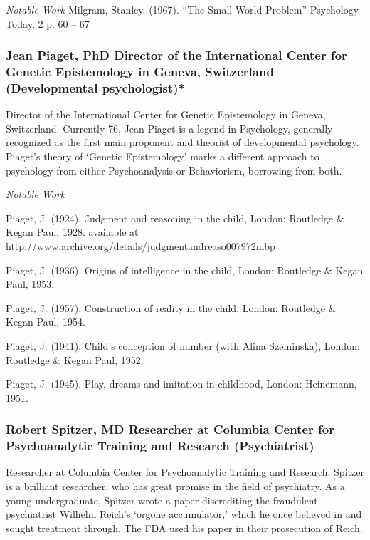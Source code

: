 \emph{Notable Work}
Milgram, Stanley. (1967). ``The Small World Problem'' Psychology Today, 2 p. 60 – 67

\subsubsection{Jean Piaget, PhD Director of the International Center for Genetic Epistemology in Geneva, Switzerland (Developmental psychologist)*}
\label{jeanpiagetphddirectoroftheinternationalcenterforgeneticepistemologyingenevaswitzerlanddevelopmentalpsychologist}

Director of the International Center for Genetic Epistemology in Geneva, Switzerland. Currently 76, Jean Piaget is a legend in Psychology, generally recognized as the first main proponent and theorist of developmental psychology. Piaget's theory of `Genetic Epistemology' marks a different approach to psychology from either Psychoanalysis or Behaviorism, borrowing from both.

\emph{Notable Work}

Piaget, J. (1924). Judgment and reasoning in the child, London: Routledge \& Kegan Paul, 1928. available at http:\slash \slash www.archive.org\slash details\slash judgmentandreaso007972mbp

Piaget, J. (1936). Origins of intelligence in the child, London: Routledge \& Kegan Paul, 1953.

Piaget, J. (1957). Construction of reality in the child, London: Routledge \& Kegan Paul, 1954.

Piaget, J. (1941). Child's conception of number (with Alina Szeminska), London: Routledge \& Kegan Paul, 1952.

Piaget, J. (1945). Play, dreams and imitation in childhood, London: Heinemann, 1951.

\subsubsection{Robert Spitzer, MD Researcher at Columbia Center for Psychoanalytic Training and Research (Psychiatrist)}
\label{robertspitzermdresearcheratcolumbiacenterforpsychoanalytictrainingandresearchpsychiatrist}

Researcher at Columbia Center for Psychoanalytic Training and Research. Spitzer is a brilliant researcher, who has great promise in the field of psychiatry. As a young undergraduate, Spitzer wrote a paper discrediting the fraudulent psychiatrist Wilhelm Reich's `orgone accumulator,' which he once believed in and sought treatment through. The FDA used his paper in their prosecution of Reich.


